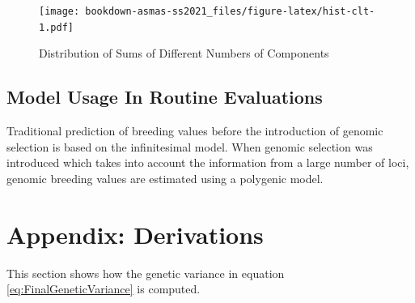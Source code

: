 \documentclass[
]{book}
\theoremstyle{definition}
\theoremstyle{definition}
\theoremstyle{definition}
\theoremstyle{remark}
\begin{document}
\begin{figure}
\centering
\texttt{[image: bookdown-asmas-ss2021\_files/figure-latex/hist-clt-1.pdf]}
\caption{\label{fig:hist-clt}Distribution of Sums of Different Numbers of Components}
\end{figure}

\hypertarget{model-usage-in-routine-evaluations}{%
\subsection{Model Usage In Routine Evaluations}\label{model-usage-in-routine-evaluations}}

Traditional prediction of breeding values before the introduction of genomic selection is based on the infinitesimal model. When genomic selection was introduced which takes into account the information from a large number of loci, genomic breeding values are estimated using a polygenic model.

\hypertarget{appendix-derivations}{%
\section{Appendix: Derivations}\label{appendix-derivations}}

This section shows how the genetic variance in equation \eqref{eq:FinalGeneticVariance} is computed.
\end{document}
